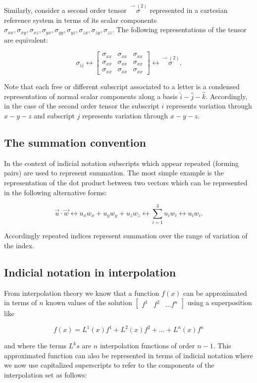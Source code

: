 Similarly, consider a second order tensor $\overset{\rightharpoonup(2)}\sigma$ represented in a cartesian reference system in terms of its scalar components $\sigma_{xx} , \sigma_{xy}, \sigma_{xz} , \sigma_{yx}, \sigma_{yy}, \sigma_{yz}, \sigma_{zx}, \sigma_{zy}, \sigma_{zz}$. The following representations of the tensor are equivalent:

\[\sigma_{ij}\leftrightarrow\begin{bmatrix}\sigma_{xx}&\sigma_{xx}&\sigma_{xx}\\\sigma_{xx}&\sigma_{xx}&\sigma_{xx}\\\sigma_{xx}&\sigma_{xx}&\sigma_{xx}\end{bmatrix}\leftrightarrow\overset{\rightharpoonup(2)}\sigma.\]

Note that each free or different subscript associated to a letter is a condensed representation of normal scalar components along a basis $\widehat i-\widehat j-\widehat k$. Accordingly, in the case of the second order tensor the subscript $i$ represents variation through $x-y-z$ and subscript $j$ represents variation through $x-y-z.$

\subsection{The summation convention}
In the context of indicial notation subscripts which appear repeated (forming pairs) are used to represent summation. The most simple example is the representation of the dot product between two vectors which can be represented in the following alternative forms:

\[\overrightarrow u\cdot\overrightarrow w\leftrightarrow u_xw_x+u_yw_y+u_zw_z\leftrightarrow\sum_{i=1}^3u_iw_i\leftrightarrow u_iw_i.\]

Accordingly repeated indices represent summation over the range of variation of the index.

\subsection{Indicial notation in interpolation}
From interpolation theory we know that a function $f(x)$ can be approximated in terms of $n$ known values of the solution $\begin{bmatrix}f^1&f^2&...f^n\end{bmatrix}$ using a superposition like

\[f(x)=L^1(x)f^1+L^2(x)f^2+...+L^n(x)f^n\]

and where the terms $L^k s$ are $n$ interpolation functions of order $n-1$. This approximated function can also be represented in terms of indicial notation where we now use capitalized superscripts to refer to the components of the interpolation set as follows:

